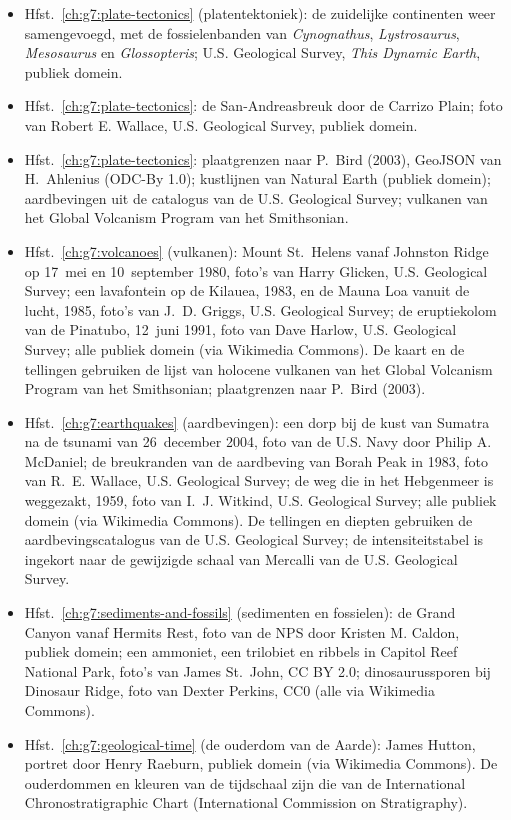 \begin{itemize}
  \item Hfst.~\ref{ch:g7:plate-tectonics} (platentektoniek): de zuidelijke continenten weer samengevoegd, met de fossielenbanden van \emph{Cynognathus}, \emph{Lystrosaurus}, \emph{Mesosaurus} en \emph{Glossopteris}; U.S. Geological Survey, \emph{This Dynamic Earth}, publiek domein.
  \item Hfst.~\ref{ch:g7:plate-tectonics}: de San-Andreasbreuk door de Carrizo Plain; foto van Robert E. Wallace, U.S. Geological Survey, publiek domein.
  \item Hfst.~\ref{ch:g7:plate-tectonics}: plaatgrenzen naar P.~Bird (2003), GeoJSON van H.~Ahlenius (ODC-By 1.0); kustlijnen van Natural Earth (publiek domein); aardbevingen uit de catalogus van de U.S. Geological Survey; vulkanen van het Global Volcanism Program van het Smithsonian.
  \item Hfst.~\ref{ch:g7:volcanoes} (vulkanen): Mount St.~Helens vanaf Johnston Ridge op 17~mei en 10~september 1980, foto's van Harry Glicken, U.S. Geological Survey; een lavafontein op de Kilauea, 1983, en de Mauna Loa vanuit de lucht, 1985, foto's van J.~D. Griggs, U.S. Geological Survey; de eruptiekolom van de Pinatubo, 12~juni 1991, foto van Dave Harlow, U.S. Geological Survey; alle publiek domein (via Wikimedia Commons). De kaart en de tellingen gebruiken de lijst van holocene vulkanen van het Global Volcanism Program van het Smithsonian; plaatgrenzen naar P.~Bird (2003).
  \item Hfst.~\ref{ch:g7:earthquakes} (aardbevingen): een dorp bij de kust van Sumatra na de tsunami van 26~december 2004, foto van de U.S. Navy door Philip A. McDaniel; de breukranden van de aardbeving van Borah Peak in 1983, foto van R.~E. Wallace, U.S. Geological Survey; de weg die in het Hebgenmeer is weggezakt, 1959, foto van I.~J. Witkind, U.S. Geological Survey; alle publiek domein (via Wikimedia Commons). De tellingen en diepten gebruiken de aardbevingscatalogus van de U.S. Geological Survey; de intensiteitstabel is ingekort naar de gewijzigde schaal van Mercalli van de U.S. Geological Survey.
  \item Hfst.~\ref{ch:g7:sediments-and-fossils} (sedimenten en fossielen): de Grand Canyon vanaf Hermits Rest, foto van de NPS door Kristen M. Caldon, publiek domein; een ammoniet, een trilobiet en ribbels in Capitol Reef National Park, foto's van James St.~John, CC BY 2.0; dinosaurussporen bij Dinosaur Ridge, foto van Dexter Perkins, CC0 (alle via Wikimedia Commons).
  \item Hfst.~\ref{ch:g7:geological-time} (de ouderdom van de Aarde): James Hutton, portret door Henry Raeburn, publiek domein (via Wikimedia Commons). De ouderdommen en kleuren van de tijdschaal zijn die van de International Chronostratigraphic Chart (International Commission on Stratigraphy).

\end{itemize}

